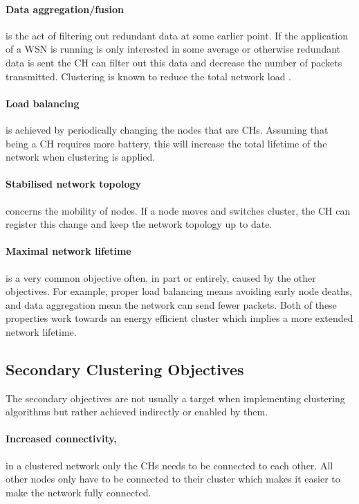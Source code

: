 \paragraph*{Data aggregation/fusion} is the act of filtering out redundant data at some earlier point. If the application of a WSN is running is only interested in some average or otherwise redundant data is sent the CH can filter out this data and decrease the number of packets transmitted. Clustering is known to reduce the total network load \cite{Afsar2014-clustering-survey}.

\paragraph*{Load balancing} is achieved by periodically changing the nodes that are CHs. Assuming that being a CH requires more battery, this will increase the total lifetime of the network when clustering is applied.

\paragraph*{Stabilised network topology} concerns the mobility of nodes. If a node moves and switches cluster, the CH can register this change and keep the network topology up to date.

\paragraph*{Maximal network lifetime} is a very common objective often, in part or entirely, caused by the other objectives. For example, proper load balancing means avoiding early node deaths, and data aggregation mean the network can send fewer packets. Both of these properties work towards an energy efficient cluster which implies a more extended network lifetime. 

\subsection{Secondary Clustering Objectives}
The secondary objectives are not usually a target when implementing clustering algorithms but rather achieved indirectly or enabled by them.

\paragraph*{Increased connectivity,} in a clustered network only the CHs needs to be connected to each other. All other nodes only have to be connected to their cluster which makes it easier to make the network fully connected.

